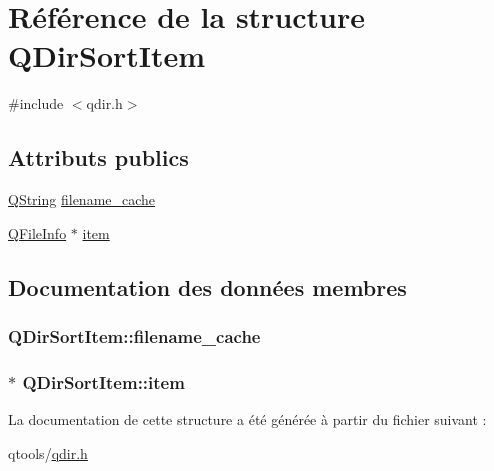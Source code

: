 \hypertarget{struct_q_dir_sort_item}{}\section{Référence de la structure Q\+Dir\+Sort\+Item}
\label{struct_q_dir_sort_item}


{\ttfamily \#include $<$qdir.\+h$>$}

\subsection*{Attributs publics}
\begin{DoxyCompactItemize}
\item 
\hyperlink{class_q_string}{Q\+String} \hyperlink{struct_q_dir_sort_item_aeaaaa4a9f88629bbbd1259f355a74a39}{filename\+\_\+cache}
\item 
\hyperlink{class_q_file_info}{Q\+File\+Info} $\ast$ \hyperlink{struct_q_dir_sort_item_ae6631193dc0be8650862d59896c3550c}{item}
\end{DoxyCompactItemize}


\subsection{Documentation des données membres}
\hypertarget{struct_q_dir_sort_item_aeaaaa4a9f88629bbbd1259f355a74a39}{}
\subsubsection[{filename\+\_\+cache}]{ Q\+Dir\+Sort\+Item\+::filename\+\_\+cache}\label{struct_q_dir_sort_item_aeaaaa4a9f88629bbbd1259f355a74a39}
\hypertarget{struct_q_dir_sort_item_ae6631193dc0be8650862d59896c3550c}{}
\subsubsection[{item}]{$\ast$ Q\+Dir\+Sort\+Item\+::item}\label{struct_q_dir_sort_item_ae6631193dc0be8650862d59896c3550c}


La documentation de cette structure a été générée à partir du fichier suivant \+:\begin{DoxyCompactItemize}
\item 
qtools/\hyperlink{qdir_8h}{qdir.\+h}\end{DoxyCompactItemize}
